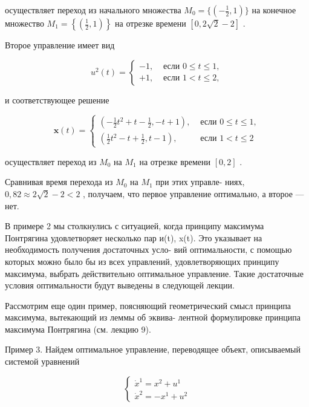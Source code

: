 \documentclass[8pt]{extarticle}
\begin{document}
осуществляет переход из начального множества \({M}_{0} = \{ \left( {-\frac{1}{2},1}\right) \}\) на конечное множество \({M}_{1} = \left\{  \left( {\frac{1}{2},1}\right) \right\}\) на отрезке времени \(\left\lbrack  {0,2\sqrt{2} - 2}\right\rbrack\) .

Второе управление имеет вид

\[
{u}^{2}\left( t\right)  = \left\{  \begin{array}{ll}  - 1, & \text{ если }0 \leq  t \leq  1, \\   + 1, & \text{ если }1 < t \leq  2, \end{array}\right.
\]

и соответствующее решение

\[
\mathbf{x}\left( t\right)  = \left\{  \begin{array}{ll} \left( {-\frac{1}{2}{t}^{2} + t - \frac{1}{2}, - t + 1}\right) , & \text{ если }0 \leq  t \leq  1, \\  \left( {\frac{1}{2}{t}^{2} - t + \frac{1}{2},t - 1}\right) , & \text{ если }1 < t \leq  2 \end{array}\right.
\]

осуществляет переход из \({M}_{0}\) на \({M}_{1}\) на отрезке времени \(\left\lbrack  {0,2}\right\rbrack\) .

Сравнивая время перехода из \({M}_{0}\) на \({M}_{1}\) при этих управле- ниях, \(0{,}82 \approx  2\sqrt{2} - 2 < 2\) , получаем, что первое управление оптимально, а второе — нет.

В примере 2 мы столкнулись с ситуацией, когда принципу максимума Понтрягина удовлетворяет несколько пар и(t), x(t). Это указывает на необходимость получения достаточных усло- вий оптимальности, с помощью которых можно было бы из всех управлений, удовлетворяющих принципу максимума, выбрать действительно оптимальное управление. Такие достаточные условия оптимальности будут выведены в следующей лекции.

Рассмотрим еще один пример, поясняющий геометрический смысл принципа максимума, вытекающий из леммы об эквива- лентной формулировке принципа максимума Понтрягина (см. лекцию 9).

Пример 3. Найдем оптимальное управление, переводящее объект, описываемый системой уравнений

\[
\left\{  \begin{array}{l} {\dot{x}}^{1} = {x}^{2} + {u}^{1} \\  {\dot{x}}^{2} =  - {x}^{1} + {u}^{2} \end{array}\right. \tag{10.13}
\]
\end{document}

